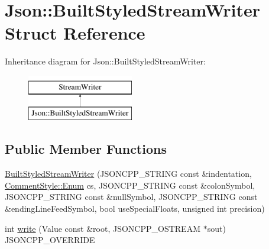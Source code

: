 \hypertarget{structJson_1_1BuiltStyledStreamWriter}{\section{Json\-:\-:Built\-Styled\-Stream\-Writer Struct Reference}
\label{structJson_1_1BuiltStyledStreamWriter}
}
Inheritance diagram for Json\-:\-:Built\-Styled\-Stream\-Writer\-:\begin{figure}[H]
\begin{center}
\leavevmode
\includegraphics[height=2.000000cm]{structJson_1_1BuiltStyledStreamWriter}
\end{center}
\end{figure}
\subsection*{Public Member Functions}
\begin{DoxyCompactItemize}
\item 
\hyperlink{structJson_1_1BuiltStyledStreamWriter_adf11b7d1ee3c68d096b7c662ee85948e}{Built\-Styled\-Stream\-Writer} (J\-S\-O\-N\-C\-P\-P\-\_\-\-S\-T\-R\-I\-N\-G const \&indentation, \hyperlink{structJson_1_1CommentStyle_a51fc08f3518fd81eba12f340d19a3d0c}{Comment\-Style\-::\-Enum} cs, J\-S\-O\-N\-C\-P\-P\-\_\-\-S\-T\-R\-I\-N\-G const \&colon\-Symbol, J\-S\-O\-N\-C\-P\-P\-\_\-\-S\-T\-R\-I\-N\-G const \&null\-Symbol, J\-S\-O\-N\-C\-P\-P\-\_\-\-S\-T\-R\-I\-N\-G const \&ending\-Line\-Feed\-Symbol, bool use\-Special\-Floats, unsigned int precision)
\item 
int \hyperlink{structJson_1_1BuiltStyledStreamWriter_a823cdb1afabb6b0d5f39bcd5a6a6f747}{write} (Value const \&root, J\-S\-O\-N\-C\-P\-P\-\_\-\-O\-S\-T\-R\-E\-A\-M $\ast$sout) J\-S\-O\-N\-C\-P\-P\-\_\-\-O\-V\-E\-R\-R\-I\-D\-E
\end{DoxyCompactItemize}


